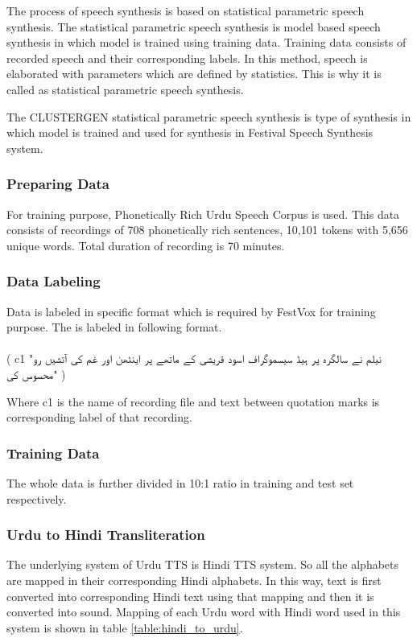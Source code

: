 \begin{itemize}
The process of speech synthesis is based on statistical parametric speech synthesis. The statistical parametric speech synthesis is model 
based speech synthesis in which model is trained using training data. Training data consists of recorded speech and their corresponding labels. 
In this method, speech is elaborated with parameters which are defined by statistics. This is why it is called as statistical parametric speech synthesis. 

The CLUSTERGEN statistical parametric speech synthesis is type of synthesis in which model is trained and used for synthesis in 
Festival Speech Synthesis system. 

\subsubsection{Preparing Data}

For training purpose, Phonetically Rich Urdu Speech Corpus \cite{urdu_corpus} is used. This data consists of recordings of 708 phonetically rich sentences, 
10,101 tokens with 5,656 unique words. Total duration of recording is 70 minutes.

\subsubsection{Data Labeling}
Data is labeled in specific format which is required by FestVox for training purpose. The is labeled in following format.
\\ \\
( c1 "\texturdu{نیلم نے سالگرہ پر ہیڈ سیسموگراف اسود قریشی کے ماتھے پر اینٹھن اور غم کی آتشیں رو محسوس کی}" )

Where c1 is the name of recording file and text between quotation marks is corresponding label of that recording.

\subsubsection{Training Data}

The whole data is further divided in 10:1 ratio in training and test set respectively.


\subsubsection{Urdu to Hindi Transliteration}

The underlying system of Urdu TTS is Hindi TTS system. So all the alphabets are mapped in their corresponding Hindi alphabets. 
In this way, text is first converted into corresponding Hindi text using that mapping and then it is converted into sound. 
Mapping of each Urdu word with Hindi word used in this system is shown in table \ref{table:hindi_to_urdu}.


\end{itemize}
